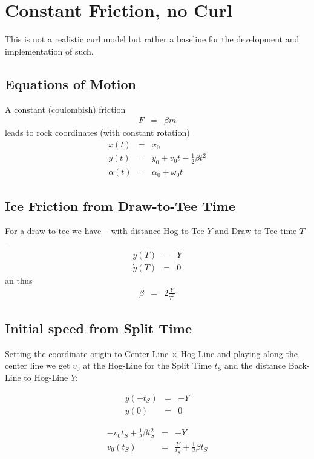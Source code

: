 \section{Constant Friction, no Curl}
This is not a realistic curl model but rather a baseline for the development and
implementation of such.

\subsection{Equations of Motion}
A constant (coulombish) friction 
\begin{eqnarray}
F &=& \beta m
\end{eqnarray}
leads to rock coordinates (with constant rotation)
\begin{eqnarray}
x(t) &=& x_0 \\
y(t) &=& y_0 + v_0t - \frac{1}{2}\beta t^2 \\
\alpha(t) &=& \alpha_0 + \omega_0 t
\end{eqnarray}

\subsection{Ice Friction from Draw-to-Tee Time}
For a draw-to-tee we have -- with distance Hog-to-Tee $Y$ and Draw-to-Tee time 
$T$ --
\begin{eqnarray}
y(T) &=& Y \\
\dot y(T) &=& 0
\end{eqnarray}
an thus
\begin{eqnarray}
\beta &=& 2 \frac {Y}{T^2}
\end{eqnarray}

\subsection{Initial speed from Split Time}
Setting the coordinate origin to Center Line $\times$ Hog Line and playing
along the center line we get $v_0$ at the Hog-Line for the Split Time $t_S$ and
the distance Back-Line to Hog-Line $Y$:

\begin{eqnarray}
y(-t_S) &=& -Y \\
y(0) &=& 0 
\end{eqnarray}

\begin{eqnarray}
-v_0 t_S + \frac{1}{2}\beta t_S^2 &=& -Y \\
v_0(t_S) &=& \frac{Y}{t_S} + \frac{1}{2}\beta t_S
\end{eqnarray}
